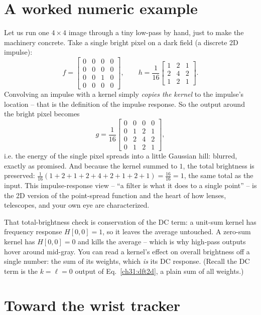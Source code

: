 \section{A worked numeric example}
\label{ch31:worked}

Let us run one $4\times4$ image through a tiny low-pass by hand, just to make the
machinery concrete. Take a single bright pixel on a dark field (a discrete 2D
impulse):
\[
f = \begin{bmatrix}
0&0&0&0\\ 0&0&0&0\\ 0&0&1&0\\ 0&0&0&0
\end{bmatrix},
\qquad
h = \frac{1}{16}\begin{bmatrix}1&2&1\\2&4&2\\1&2&1\end{bmatrix}.
\]
Convolving an impulse with a kernel simply \emph{copies the kernel} to the
impulse's location -- that is the definition of the impulse response. So the output
around the bright pixel becomes
\[
g = \frac{1}{16}\begin{bmatrix}
0&0&0&0\\ 0&1&2&1\\ 0&2&4&2\\ 0&1&2&1
\end{bmatrix},
\]
i.e. the energy of the single pixel spreads into a little Gaussian hill: blurred,
exactly as promised. And because the kernel summed to $1$, the total brightness is
preserved: $\tfrac1{16}(1+2+1+2+4+2+1+2+1) = \tfrac{16}{16} = 1$, the same total as
the input. This impulse-response view -- ``a filter is what it does to a single
point'' -- is the 2D version of the point-spread function and the heart of how
lenses, telescopes, and your own eye are characterized.

\begin{connectionbox}
That total-brightness check is conservation of the DC term: a unit-sum kernel has
frequency response $H[0,0]=1$, so it leaves the average untouched. A zero-sum
kernel has $H[0,0]=0$ and kills the average -- which is why high-pass outputs hover
around mid-gray. You can read a kernel's effect on overall brightness off a single
number: the sum of its weights, which \emph{is} its DC response. (Recall the DC
term is the $k=\ell=0$ output of Eq.~\eqref{ch31:dft2d}, a plain sum of all
weights.)
\end{connectionbox}

\section{Toward the wrist tracker}
\label{ch31:goal}

